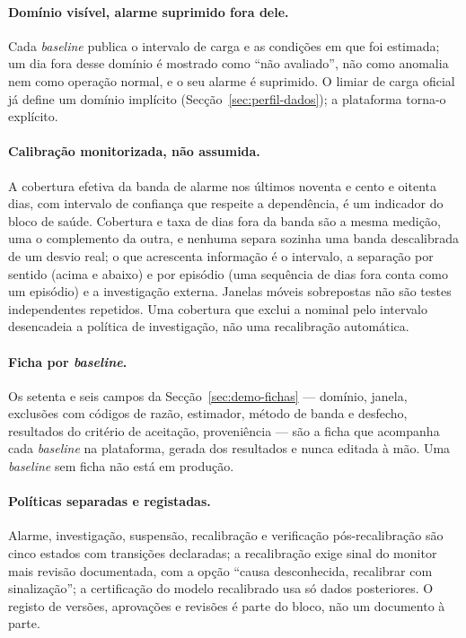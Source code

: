 \paragraph{Domínio visível, alarme suprimido fora dele.} Cada
\emph{baseline} publica o intervalo de carga e as condições em que foi
estimada; um dia fora desse domínio é mostrado como ``não avaliado'', não
como anomalia nem como operação normal, e o seu alarme é suprimido. O limiar de carga oficial já
define um domínio implícito (Secção~\ref{sec:perfil-dados}); a plataforma
torna-o explícito.

\paragraph{Calibração monitorizada, não assumida.} A cobertura efetiva da
banda de alarme nos últimos noventa e cento e oitenta dias, com intervalo de
confiança que respeite a dependência, é um indicador do bloco de saúde.
Cobertura e taxa de dias fora da banda são a mesma medição, uma o
complemento da outra, e nenhuma separa sozinha uma banda descalibrada de um
desvio real; o que acrescenta informação é o intervalo, a separação por
sentido (acima e abaixo) e por episódio (uma sequência de dias fora conta
como um episódio) e a investigação externa. Janelas móveis sobrepostas não
são testes independentes repetidos. Uma cobertura
que exclui a nominal pelo intervalo desencadeia a política de investigação,
não uma recalibração automática.

\paragraph{Ficha por \emph{baseline}.} Os setenta e seis campos da
Secção~\ref{sec:demo-fichas} --- domínio, janela, exclusões com códigos de
razão, estimador, método de banda e desfecho, resultados do critério de
aceitação, proveniência --- são a ficha que acompanha cada \emph{baseline}
na plataforma, gerada dos resultados e nunca editada à mão. Uma
\emph{baseline} sem ficha não está em produção.

\paragraph{Políticas separadas e registadas.} Alarme, investigação, suspensão,
recalibração e verificação pós-recalibração são cinco estados com transições
declaradas; a recalibração exige sinal do monitor mais revisão documentada,
com a opção ``causa desconhecida, recalibrar com sinalização''; a
certificação do modelo recalibrado usa só dados posteriores. O registo de
versões, aprovações e revisões é parte do bloco, não um documento à parte.

